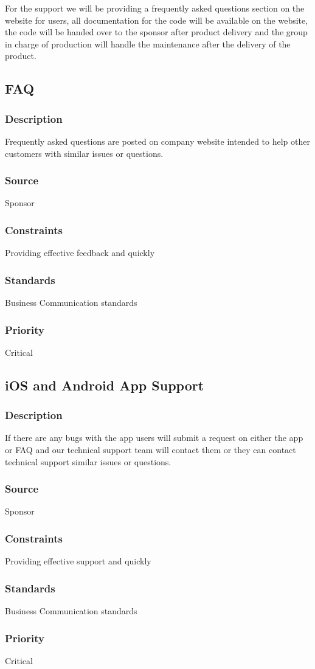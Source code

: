 For the support we will be providing a frequently asked questions section on the website for users, all documentation for the code will be available on the website, the code will be handed over to the sponsor after product delivery and the group in charge of production will handle the maintenance after the delivery of the product.

\subsection{FAQ}
\subsubsection{Description}
Frequently asked questions are posted on company website intended to help other customers with similar issues or questions.
\subsubsection{Source}
Sponsor
\subsubsection{Constraints}
Providing effective feedback and quickly
\subsubsection{Standards}
Business Communication standards 
\subsubsection{Priority}
 Critical
 
 \subsection{iOS and Android App Support}
\subsubsection{Description}
If there are any bugs with the app users will submit a request on either the app or FAQ and our technical support team will contact them or they can contact technical support
 similar issues or questions.
\subsubsection{Source}
Sponsor
\subsubsection{Constraints}
Providing effective support and quickly
\subsubsection{Standards}
Business Communication standards 
\subsubsection{Priority}
 Critical